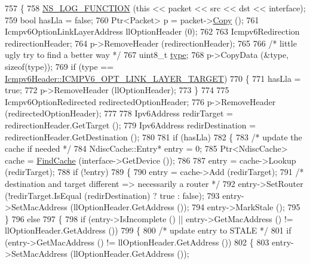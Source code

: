 \begin{DoxyCode}
757 \{
758   \hyperlink{log-macros-disabled_8h_a90b90d5bad1f39cb1b64923ea94c0761}{NS\_LOG\_FUNCTION} (\textcolor{keyword}{this} << packet << src << dst << interface);
759   \textcolor{keywordtype}{bool} hasLla = \textcolor{keyword}{false};
760   Ptr<Packet> p = packet->\hyperlink{classns3_1_1Packet_a5d5c70802a5f77fc5f0001e0cfc1898b}{Copy} ();
761   Icmpv6OptionLinkLayerAddress llOptionHeader (0);
762 
763   Icmpv6Redirection redirectionHeader;
764   p->RemoveHeader (redirectionHeader);
765 
766   \textcolor{comment}{/* little ugly try to find a better way */}
767   uint8\_t \hyperlink{visualizer-ideas_8txt_add98db9e15e2a58cf2b57623e7aa893a}{type};
768   p->CopyData (&type, \textcolor{keyword}{sizeof}(type));
769   \textcolor{keywordflow}{if} (type == \hyperlink{classns3_1_1Icmpv6Header_a1992e0e28c453f5e23b1ad55a49b7908a9a014e199d5c5492a04523cf04938b26}{Icmpv6Header::ICMPV6\_OPT\_LINK\_LAYER\_TARGET})
770     \{
771       hasLla = \textcolor{keyword}{true};
772       p->RemoveHeader (llOptionHeader);
773     \}
774 
775   Icmpv6OptionRedirected redirectedOptionHeader;
776   p->RemoveHeader (redirectedOptionHeader);
777 
778   Ipv6Address redirTarget = redirectionHeader.GetTarget ();
779   Ipv6Address redirDestination = redirectionHeader.GetDestination ();
780 
781   \textcolor{keywordflow}{if} (hasLla)
782     \{
783       \textcolor{comment}{/* update the cache if needed */}
784       NdiscCache::Entry* entry = 0;
785       Ptr<NdiscCache> cache = \hyperlink{classns3_1_1Icmpv6L4Protocol_a90167126423f3957718e22a8bcd325c8}{FindCache} (interface->GetDevice ());
786 
787       entry = cache->Lookup (redirTarget);
788       \textcolor{keywordflow}{if} (!entry)
789         \{
790           entry = cache->Add (redirTarget);
791           \textcolor{comment}{/* destination and target different => necessarily a router */}
792           entry->SetRouter (!redirTarget.IsEqual (redirDestination) ? \textcolor{keyword}{true} : \textcolor{keyword}{false});
793           entry->SetMacAddress (llOptionHeader.GetAddress ());
794           entry->MarkStale ();
795         \}
796       \textcolor{keywordflow}{else}
797         \{
798           \textcolor{keywordflow}{if} (entry->IsIncomplete () || entry->GetMacAddress () != llOptionHeader.GetAddress ())
799             \{
800               \textcolor{comment}{/* update entry to STALE */}
801               \textcolor{keywordflow}{if} (entry->GetMacAddress () != llOptionHeader.GetAddress ())
802                 \{
803                   entry->SetMacAddress (llOptionHeader.GetAddress ());

\end{DoxyCode}
